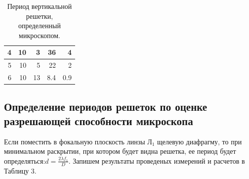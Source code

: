 \documentclass[a4paper,12pt]{article}
\begin{document}
\begin{table}[h!]
\begin{tabular}{|r|r|r|r|r|}
4                                                                        & 10                                                                              & 3                                                                           & 36                                                                              & 4                                                                                      \\ \hline
5                                                                        & 10                                                                              & 5                                                                           & 22                                                                              & 2                                                                                      \\ \hline
6                                                                        & 10                                                                              & 13                                                                          & 8.4                                                                             & 0.9                                                                                    \\ \hline
\end{tabular}
\caption{Период вертикальной решетки, определенный микроскопом.}
\label{tab:my-table}
\end{table}
		
	
\subsection{Определение периодов решеток по оценке разрешающей способности микроскопа}
	
	Если поместить в фокальную плоскость линзы Л$_1$ щелевую диафрагму, то при минимальном раскрытии, при котором будет видна решетка, ее период будет определяться:$d = \frac{2\lambda f_1}{D}$. Запишем результаты проведеных измерений и расчетов в Таблицу 3.
\end{document}
